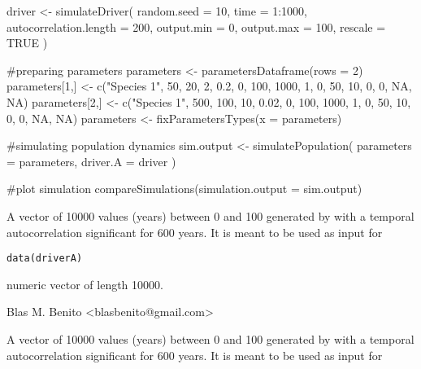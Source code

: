 \documentclass[letterpaper]{book}
\begin{document}
%
\begin{Examples}
\begin{ExampleCode}

driver <- simulateDriver(
 random.seed = 10,
 time = 1:1000,
 autocorrelation.length = 200,
 output.min = 0,
 output.max = 100,
 rescale = TRUE
 )

#preparing parameters
parameters <- parametersDataframe(rows = 2)
parameters[1,] <- c("Species 1", 50, 20, 2, 0.2, 0, 100, 1000, 1, 0, 50, 10, 0, 0, NA, NA)
parameters[2,] <- c("Species 1", 500, 100, 10, 0.02, 0, 100, 1000, 1, 0, 50, 10, 0, 0, NA, NA)
parameters <- fixParametersTypes(x = parameters)

#simulating population dynamics
sim.output <- simulatePopulation(
 parameters = parameters,
 driver.A = driver
 )

#plot simulation
compareSimulations(simulation.output = sim.output)

\end{ExampleCode}
\end{Examples}
%
\begin{Description}\relax
A vector of 10000 values (years) between 0 and 100 generated by  with a temporal autocorrelation significant for 600 years. It is meant to be used as input for 
\end{Description}
%
\begin{Usage}
\begin{verbatim}
data(driverA)
\end{verbatim}
\end{Usage}
%
\begin{Format}
numeric vector of length 10000.
\end{Format}
%
\begin{Author}\relax
Blas M. Benito  <blasbenito@gmail.com>
\end{Author}
%
\begin{SeeAlso}\relax
{}
\end{SeeAlso}
%
\begin{Description}\relax
A vector of 10000 values (years) between 0 and 100 generated by  with a temporal autocorrelation significant for 600 years. It is meant to be used as input for 
\end{Description}
\end{document}
